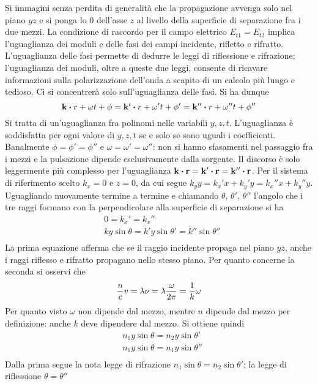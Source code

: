 Si immagini senza perdita di generalità che la propagazione avvenga solo nel piano $yz$ e si
ponga lo $0$ dell'asse $z$ al livello della superficie di separazione fra i due mezzi.
La condizione di raccordo per il campo elettrico $E_{t1}=E_{t2}$ implica l'uguaglianza
dei moduli e delle fasi dei campi incidente, rifletto e rifratto. L'uguaglianza delle fasi
permette di dedurre le leggi di riflessione e rifrazione; l'uguaglianza dei moduli,
oltre a queste due leggi, consente di ricavare informazioni sulla polarizzazione dell'onda
a scapito di un calcolo più lungo e tedioso. Ci si concentrerà solo sull'uguaglianza delle
fasi. Si ha dunque
\[
\vb{k}\vdot{r}+\omega t+\phi=\vb{k}'\vdot{r}+\omega' t+\phi'=\vb{k}''\vdot{r}+\omega'' t+\phi''
\]
Si tratta di un'uguaglianza fra polinomi nelle variabili $y,z,t$. L'uguaglianza è soddisfatta
per ogni valore di $y,z,t$ se e solo se sono uguali i coefficienti.
Banalmente $\phi=\phi'=\phi''$ e $\omega=\omega'=\omega''$: non si hanno sfasamenti
nel passaggio fra i mezzi e la pulsazione dipende esclusivamente dalla sorgente.
Il discorso è solo leggermente più complesso per l'uguaglianza
$\vb{k}\vdot\vb{r}=\vb{k}'\vdot\vb{r}=\vb{k}''\vdot\vb{r}$.
Per il sistema di riferimento scelto $k_x=0$ e $z=0$, da cui segue
$k_y y=k_x'x+k_y'y=k_x''x+k_y''y$. Uguagliando nuovamente termine a termine e
chiamando $\theta$, $\theta'$, $\theta''$ l'angolo
che i tre raggi formano con la perpendicolare alla superficie di separazione si ha
\[
\begin{split}
&0=k_x'=k_x''\\
&k y\sin{\theta}=k'y\sin{\theta'}=k''\sin{\theta''}\\
\end{split}
\]
La prima equazione afferma che se il raggio incidente propaga nel piano $yz$, anche i raggi
riflesso e rifratto propagano nello stesso piano. Per quanto concerne la seconda si osservi che
\[
\frac{n}{c}v=\lambda\nu=\lambda\frac{\omega}{2\pi}=\frac{1}{k}\omega
\]
Per quanto visto $\omega$ non dipende dal mezzo, mentre $n$ dipende dal mezzo per definizione:
anche $k$ deve dipendere dal mezzo. Si ottiene quindi
\[
\begin{split}
&n_1 y \sin{\theta}=n_2 y \sin{\theta'}\\
&n_1 y \sin{\theta}=n_1 y \sin{\theta''}\\
\end{split}
\]
Dalla prima segue la nota legge di rifrazione $n_1\sin{\theta}=n_2\sin{\theta'}$;
la legge di riflessione $\theta=\theta''$
